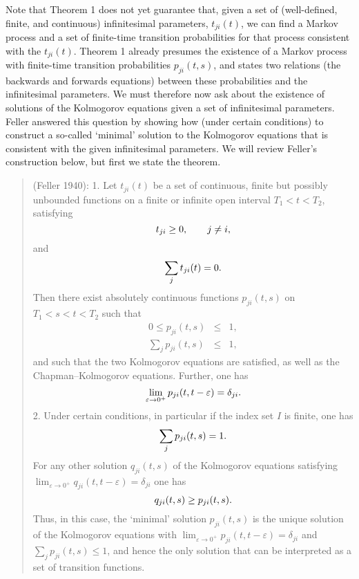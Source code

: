 \documentclass[12pt]{article}
\newcommand{\be}{\vspace*{6pt} \begin{equation}}
\newcommand{\ee}{\vspace*{10pt} \end{equation}}
\renewcommand{\epsilon}{\varepsilon}
\begin{document}
Note that Theorem 1 does not yet guarantee that, given a set of
(well-defined, finite, and continuous) infinitesimal parameters,
$t_{ji}(t)$, we can find a Markov process and a set of finite-time
transition probabilities for that process consistent with the
$t_{ji}(t)$.  Theorem 1 already presumes the existence of a Markov
process with finite-time transition probabilities $p_{ji}(t,s)$, and
states two relations (the backwards and forwards equations) between
these probabilities and the infinitesimal parameters.  We must
therefore now ask about the existence of solutions of the Kolmogorov
equations given a set of infinitesimal parameters.  Feller answered
this question by showing how (under certain conditions) to construct a
so-called `minimal' solution to the Kolmogorov equations that is
consistent with the given infinitesimal parameters.  We will review
Feller's construction below, but first we state the theorem.
\begin{quotation}
 (Feller 1940):
1. Let $t_{ji}(t)$ be a set of continuous, finite but possibly unbounded
      functions on a finite or infinite open interval $T_1<t<T_2$, satisfying
        \be
        t_{ji} \geq 0,\qquad j\neq i,
        \ee
      and
        \be
        \sum_j t_{ji}(t)=0.
        \ee
      Then there exist absolutely continuous functions $p_{ji}(t,s)$ on
      $T_1<s<t<T_2$ such that
        \begin{eqnarray}
        0\leq p_{ji}(t,s)    & \leq &     1,    \\
        \sum_j p_{ji}(t,s)   & \leq &     1,
        \end{eqnarray}
      and such that the two Kolmogorov equations are satisfied, as well as the
      Chapman--Kolmogorov equations. Further, one has
        \be
        \lim_{\epsilon\rightarrow 0^{+}}p_{ji}(t,t-\epsilon)=\delta_{ji}.
        \ee
2. Under certain conditions, in particular if the index set $I$ is finite,
      one has
        \be
        \sum_j p_{ji}(t,s)=1.
        \ee
For any other solution $q_{ji}(t,s)$ of the Kolmogorov equations satisfying
${\displaystyle \lim_{\epsilon \rightarrow 0^{+}}} q_{ji}(t,t-\epsilon) =
      \delta_{ji}$ one has
        \be
        q_{ji}(t,s)\geq p_{ji}(t,s).
        \ee
      Thus, in this case, the `minimal' solution $p_{ji}(t,s)$
      is the unique solution of the Kolmogorov equations with
${\displaystyle \lim_{\epsilon \rightarrow 0^{+}}} p_{ji}(t,t-\epsilon)
= \delta_{ji}$
      and $\sum_j p_{ji}(t,s) \leq 1$, and hence the only solution that can
      be interpreted as a set of transition functions.
\end{quotation}
\end{document}
